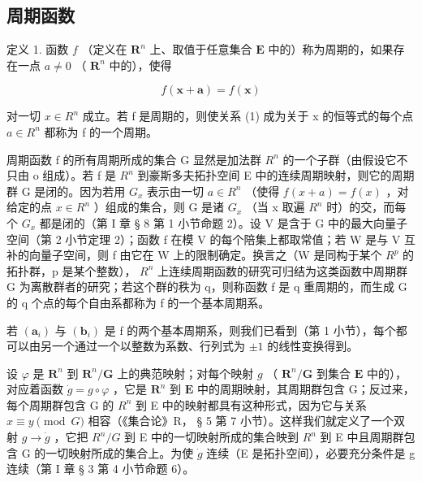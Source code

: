 \subsection{周期函数}

定义 1. 函数 \(f\) （定义在 \(\mathbf{R}^n\) 上、取值于任意集合 \(\mathbf{E}\) 中的）称为周期的，如果存在一点 \(a \neq 0\) （ \(\mathbf{R}^n\) 中的），使得

\[
f (\boldsymbol {x} + \boldsymbol {a}) = f (\boldsymbol {x})\tag{1}
\]

对一切 \(x \in R^{n}\) 成立。若 f 是周期的，则使关系 (1) 成为关于 x 的恒等式的每个点 \(a \in R^{n}\) 都称为 f 的一个周期。

周期函数 f 的所有周期所成的集合 G 显然是加法群 \(R^{n}\) 的一个子群（由假设它不只由 o 组成）。若 f 是 \(R^{n}\) 到豪斯多夫拓扑空间 E 中的连续周期映射，则它的周期群 G 是闭的。因为若用 \(G_{x}\) 表示由一切 \(a \in R^{n}\) （使得 \(f(x + a) = f(x)\) ，对给定的点 \(x \in R^{n}\) ）组成的集合，则 G 是诸 \(G_{x}\) （当 x 取遍 \(R^{n}\) 时）的交，而每个 \(G_{x}\) 都是闭的（第 I 章 § 8 第 1 小节命题 2）。设 V 是含于 G 中的最大向量子空间（第 2 小节定理 2）；函数 f 在模 V 的每个陪集上都取常值；若 W 是与 V 互补的向量子空间，则 f 由它在 W 上的限制确定。换言之（W 是同构于某个 \(R^{p}\) 的拓扑群，p 是某个整数）， \(R^{n}\) 上连续周期函数的研究可归结为这类函数中周期群 G 为离散群者的研究；若这个群的秩为 q，则称函数 f 是 q 重周期的，而生成 G 的 q 个点的每个自由系都称为 f 的一个基本周期系。

若 \((\boldsymbol{a}_{i})\) 与 \((\boldsymbol{b}_{i})\) 是 f 的两个基本周期系，则我们已看到（第 1 小节），每个都可以由另一个通过一个以整数为系数、行列式为 \(\pm1\) 的线性变换得到。

设 \(\varphi\) 是 \(\mathbf{R}^n\) 到 \(\mathbf{R}^n/\mathbf{G}\) 上的典范映射；对每个映射 \(g\) （ \(\mathbf{R}^n/\mathbf{G}\) 到集合 \(\mathbf{E}\) 中的），对应着函数 \(\dot{g}=g\circ\varphi\) ，它是 \(\mathbf{R}^n\) 到 \(\mathbf{E}\) 中的周期映射，其周期群包含 G；反过来，每个周期群包含 G 的 \(R^{n}\) 到 E 中的映射都具有这种形式，因为它与关系 \(x \equiv y \pmod{G}\) 相容（《集合论》R， § 5 第 7 小节）。这样我们就定义了一个双射 \(g \to \dot{g}\) ，它把 \(R^{n}/G\) 到 E 中的一切映射所成的集合映到 \(R^{n}\) 到 E 中且周期群包含 G 的一切映射所成的集合上。为使 \(\dot{g}\) 连续（E 是拓扑空间），必要充分条件是 g 连续（第 I 章 § 3 第 4 小节命题 6）。

